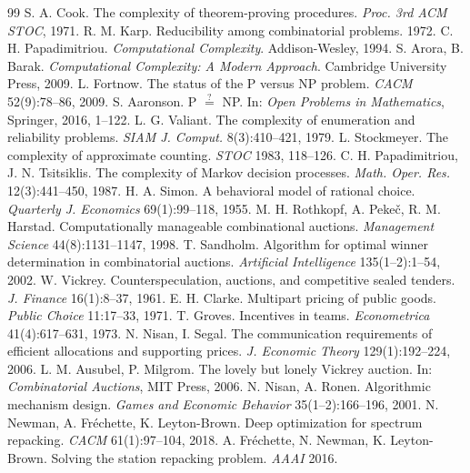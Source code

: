 \documentclass[a4paper,12pt]{article}
\theoremstyle{definition}
\begin{document}
\begin{thebibliography}{99}
 S. A. Cook. The complexity of theorem-proving procedures. \emph{Proc. 3rd ACM STOC}, 1971.
 R. M. Karp. Reducibility among combinatorial problems. 1972.
 C. H. Papadimitriou. \emph{Computational Complexity}. Addison-Wesley, 1994.
 S. Arora, B. Barak. \emph{Computational Complexity: A Modern Approach}. Cambridge University Press, 2009.
 L. Fortnow. The status of the P versus NP problem. \emph{CACM} 52(9):78--86, 2009.
 S. Aaronson. P $\overset{?}{=}$ NP. In: \emph{Open Problems in Mathematics}, Springer, 2016, 1--122.
 L. G. Valiant. The complexity of enumeration and reliability problems. \emph{SIAM J. Comput.} 8(3):410--421, 1979.
 L. Stockmeyer. The complexity of approximate counting. \emph{STOC} 1983, 118--126.
 C. H. Papadimitriou, J. N. Tsitsiklis. The complexity of Markov decision processes. \emph{Math. Oper. Res.} 12(3):441--450, 1987.
 H. A. Simon. A behavioral model of rational choice. \emph{Quarterly J. Economics} 69(1):99--118, 1955.
 M. H. Rothkopf, A. Pekeč, R. M. Harstad. Computationally manageable combinational auctions. \emph{Management Science} 44(8):1131--1147, 1998.
 T. Sandholm. Algorithm for optimal winner determination in combinatorial auctions. \emph{Artificial Intelligence} 135(1--2):1--54, 2002.
 W. Vickrey. Counterspeculation, auctions, and competitive sealed tenders. \emph{J. Finance} 16(1):8--37, 1961.
 E. H. Clarke. Multipart pricing of public goods. \emph{Public Choice} 11:17--33, 1971.
 T. Groves. Incentives in teams. \emph{Econometrica} 41(4):617--631, 1973.
 N. Nisan, I. Segal. The communication requirements of efficient allocations and supporting prices. \emph{J. Economic Theory} 129(1):192--224, 2006.
 L. M. Ausubel, P. Milgrom. The lovely but lonely Vickrey auction. In: \emph{Combinatorial Auctions}, MIT Press, 2006.
 N. Nisan, A. Ronen. Algorithmic mechanism design. \emph{Games and Economic Behavior} 35(1--2):166--196, 2001.
 N. Newman, A. Fréchette, K. Leyton-Brown. Deep optimization for spectrum repacking. \emph{CACM} 61(1):97--104, 2018.
 A. Fréchette, N. Newman, K. Leyton-Brown. Solving the station repacking problem. \emph{AAAI} 2016.

\end{thebibliography}
\end{document}

